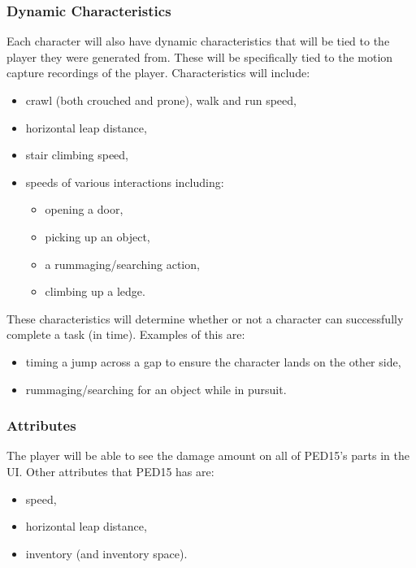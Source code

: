 \documentclass[journal]{IEEEtran}
\begin{document}
\subsubsection{Dynamic Characteristics}
Each character will also have dynamic characteristics that will be tied to the player they were generated from. These will be specifically tied to the motion capture recordings of the player. Characteristics will include:
\begin{itemize}
	\item crawl (both crouched and prone), walk and run speed,
	\item horizontal leap distance,
	\item stair climbing speed,
	\item speeds of various interactions including:
	\begin{itemize}
		\item opening a door,
		\item picking up an object,
		\item a rummaging/searching action,
		\item climbing up a ledge.
	\end{itemize}
\end{itemize}
These characteristics will determine whether or not a character can successfully complete a task (in time). Examples of this are:
\begin{itemize}
	\item timing a jump across a gap to ensure the character lands on the other side,
	\item rummaging/searching for an object while in pursuit.
\end{itemize}
\subsubsection{Attributes}
The player will be able to see the damage amount on all of PED15's parts in the UI. Other attributes that PED15 has are:
\begin{itemize}
	\item speed,
	\item horizontal leap distance,
	\item inventory (and inventory space).
\end{itemize}
\end{document}
